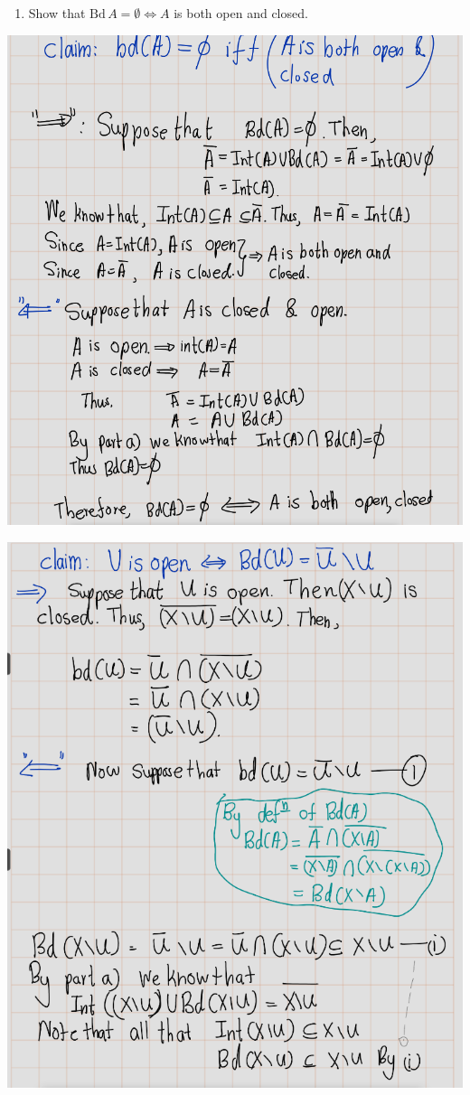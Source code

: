 \documentclass[
]{book}
\providecommand{\tightlist}{%
  \setlength{\itemsep}{0pt}\setlength{\parskip}{0pt}}
\theoremstyle{definition}
\theoremstyle{definition}
\theoremstyle{definition}
\theoremstyle{definition}
\theoremstyle{remark}
\begin{document}
\begin{enumerate}
\def\labelenumi{(\alph{enumi})}
\setcounter{enumi}{1}
\tightlist
\item
  Show that \(\text{Bd} \, A = \emptyset \Leftrightarrow A\) is both open and closed.
\end{enumerate}

\includegraphics{figures/Exercises/Ex 2.17/ex-19-3.png}

\includegraphics{figures/Exercises/Ex 2.17/ex-19-4.png}
\end{document}

